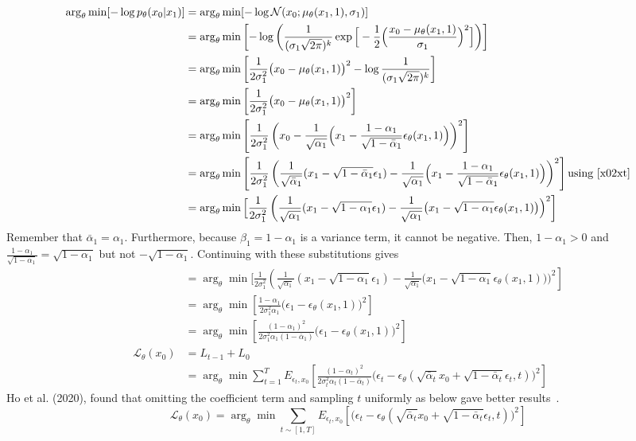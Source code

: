 \documentclass{book}
\numberwithin{equation}{subsection}
\begin{document}
\begin{align}
    \arg_\theta\min[-\log p_\theta(x_0 |x_1)]
    &= \arg_\theta\min[-\log \mathcal{N}(x_0; \mu_\theta(x_1, 1), \sigma_1)]\\
    &= \arg_\theta\min\left[-\log \left(\frac {1}{(\sigma_1\sqrt{2\pi})^k} \exp\Big[-{\frac {1}{2}}\Big(\frac {x_0-\mu_\theta(x_1, 1)}{\sigma_1}\Big)^2\Big]\right)\right]\\
    &= \arg_\theta\min\left[{\frac {1}{2\sigma_1^2}}\big(x_0-\mu_\theta(x_1, 1)\big)^2-\log \frac {1}{(\sigma_1\sqrt{2\pi})^k}\right]\\
    &= \arg_\theta\min\left[{\frac {1}{2\sigma_1^2}}\big(x_0-\mu_\theta(x_1, 1)\big)^2\right]\\
    &= \arg_\theta\min\left[{\frac {1}{2\sigma_1^2}}\left(x_0-\frac{1}{\sqrt{\alpha_1}} \Big(x_1 - \frac{1 - \alpha_1}{\sqrt{1 - \bar{\alpha}_1}} \epsilon_\theta(x_1,1) \Big)\right)^2\right]\\
    &= \arg_\theta\min\left[{\frac {1}{2\sigma_1^2}}\left(\frac{1}{\sqrt{\bar{\alpha}_1}}(x_1 - \sqrt{1 - \bar{\alpha}_1}\epsilon_1)-\frac{1}{\sqrt{\alpha_1}} \Big(x_1 - \frac{1 - \alpha_1}{\sqrt{1 - \bar{\alpha}_1}} \epsilon_\theta(x_1,1) \Big)\right)^2\right]\text{using~\ref{x02xt}}\\
    &= \arg_\theta\min\Big[{\frac {1}{2\sigma_1^2}}\left(\frac{1}{\sqrt{\alpha_1}}(x_1 - \sqrt{1 - \alpha_1}\epsilon_1)-\frac{1}{\sqrt{\alpha_1}} \big(x_1 - \sqrt{1 - \alpha_1} \epsilon_\theta(x_1,1) \big)\Big)^2\right]
\end{align}
Remember that $\bar{\alpha}_1 = \alpha_1$. Furthermore, because $\beta_1 = 1-\alpha_1$ is a variance term, it cannot be negative. Then, $1-\alpha_1 > 0$ and $\frac{1-\alpha_1}{\sqrt{1-\alpha_1}} = \sqrt{1-\alpha_1}$ but not $-\sqrt{1-\alpha_1}$. Continuing with these substitutions gives
\begin{align}
    &= \arg_\theta\min\Big[{\frac {1}{2\sigma_1^2}}\left(\frac{1}{\sqrt{\alpha_1}}(x_1 - \sqrt{1 - \alpha_1}\epsilon_1)-\frac{1}{\sqrt{\alpha_1}} \big(x_1 - \sqrt{1 - \alpha_1} \epsilon_\theta(x_1,1) \big)\Big)^2\right]\\
    &= \arg_\theta\min\left[\frac{1-\alpha_1}{2\sigma_1^2\alpha_1}\big(\epsilon_1-\epsilon_\theta(x_1,1) \big)^2\right]\\
    &= \arg_\theta\min\left[\frac{(1-\alpha_1)^2}{2\sigma_1^2\alpha_1(1 - \bar{\alpha}_1)}\big(\epsilon_1-\epsilon_\theta(x_1,1) \big)^2\right]\\
    \mathcal{L}_\theta(x_0) &= L_{t-1}+L_0\\
    &= \arg_\theta\min \sum_{t=1}^TE_{\epsilon_t, x_0}\left[\frac{(1-\alpha_t)^2}{2\sigma_t^2\alpha_t(1 - \bar{\alpha}_t)}\Big(\epsilon_t-\epsilon_\theta(\sqrt{\bar{\alpha}_t}x_0 + \sqrt{1 - \bar{\alpha}_t}\epsilon_t,t) \Big)^2\right]
\end{align}
Ho et al. (2020), found that omitting the coefficient term and sampling $t$ uniformly as below gave better results~\cite{ho_denoising_2020}.
\begin{equation}
    \mathcal{L}_\theta(x_0) = \arg_\theta\min \sum_{t \sim [1,T]}E_{\epsilon_t, x_0}\left[\Big(\epsilon_t-\epsilon_\theta(\sqrt{\bar{\alpha}_t}x_0 + \sqrt{1 - \bar{\alpha}_t}\epsilon_t,t) \Big)^2\right]
\end{equation}
\end{document}
